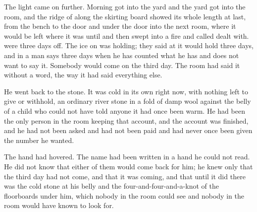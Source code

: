 The light came on further. Morning got into the yard and the yard got into the room, and the ridge of  along the skirting board showed its whole length at last, from the bench to the door and under the door into the next room, where it would be left where it was until  and then swept into a fire and called dealt with.  were three days off. The ice on  was holding; they said at  it would hold three days, and in  a man says three days when he has counted what he has and does not want to say it. Somebody would come on the third day. The room had said it without a word, the way it had said everything else.

He went back to the stone. It was cold in its own right now, with nothing left to give or withhold, an ordinary river stone in a fold of damp wool against the belly of a child who could not have told anyone it had once been warm. He had been the only person in the room keeping that account, and the account was finished, and he had not been asked and had not been paid and had never once been given the number he wanted.

The hand had hovered. The name had been written in a hand he could not read. He did not know that either of them would come back for him; he knew only that the third day had not come, and that it was coming, and that until it did there was the cold stone at his belly and the four-and-four-and-a-knot of the floorboards under him, which nobody in the room could see and nobody in the room would have known to look for.
